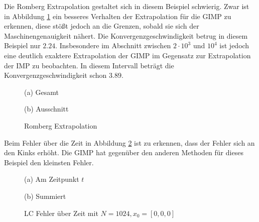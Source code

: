 Die Romberg Extrapolation gestaltet sich in diesem Beispiel schwierig. Zwar ist in Abbildung \ref{fig:lcRomberg} ein besseres Verhalten der Extrapolation für die GIMP zu erkennen, diese stößt jedoch an die Grenzen, sobald sie sich der Maschinengenauigkeit nähert.  Die Konvergenzgeschwindigkeit betrug in diesem Beispiel nur $2.24$. Insbesondere im Abschnitt zwischen $2\cdot 10^{3}$ und $10^4$ ist jedoch eine deutlich exaktere Extrapolation der GIMP im Gegensatz zur Extrapolation der IMP zu beobachten. In diesem Intervall beträgt die Konvergenzgeschwindigkeit schon $3.89$. 
\begin{figure}[H]
\footnotesize 
\centering
\begin{minipage}[b]{0.49\linewidth}

\caption*{(a) Gesamt}
\end{minipage}
\begin{minipage}[b]{0.49\linewidth}

\caption*{(b) Ausschnitt}
\end{minipage}
\caption{Romberg Extrapolation}
\label{fig:lcRomberg}
\end{figure}



Beim Fehler über die Zeit in Abbildung \ref{fig:lcErrorOverTime} ist zu erkennen, dass der Fehler sich an den Kinks erhöht. Die GIMP hat gegenüber den anderen Methoden für dieses Beispiel den kleinsten Fehler. 
\begin{figure}[H]
\footnotesize 
\centering
\begin{minipage}[b]{0.49\linewidth}

\caption*{(a) Am Zeitpunkt $t$}
\end{minipage}
\begin{minipage}[b]{0.49\linewidth}

\caption*{(b) Summiert}
\end{minipage}
\caption{LC Fehler über Zeit mit $N =1024 ,x_0 = [0,0,0]$}
\label{fig:lcErrorOverTime}
\end{figure}
